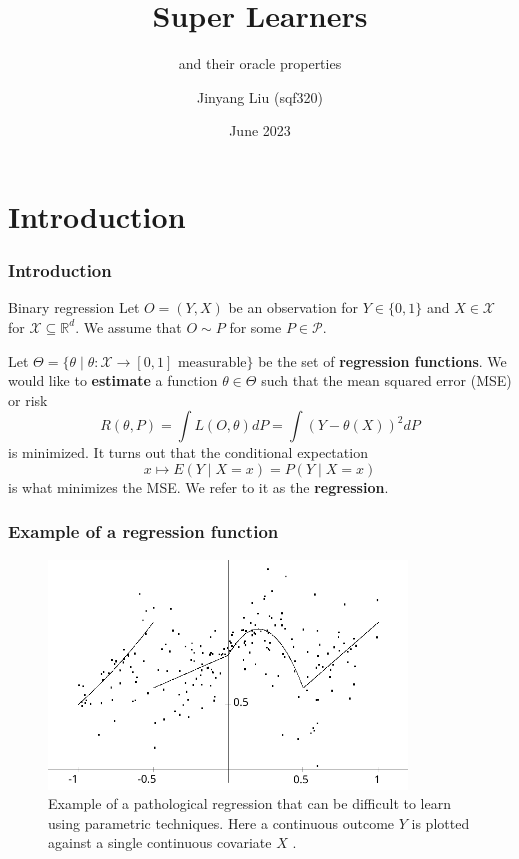 \documentclass{beamer}
\title{Super Learners}
\subtitle{and their oracle properties}
\author[Jinyang Liu (sqf320)]{Jinyang Liu (sqf320)}
\institute[UCPH] %
{
  Department of Mathematical Sciences\\
  University of Copenhagen
}
\date[VLC 2023]{June 2023}
\newcommand{\btheta}{\theta}
\begin{document}
\frame{\titlepage}
\section{Introduction}
\begin{frame}
    \frametitle{Introduction}
    \begin{block}{Binary regression}
        Let $ O = (Y, X) $ be an observation for $ Y \in \{0,1\} $ and $ X \in \mathcal{X}$ for $ \mathcal{X} \subseteq \mathbb{R}^{d} $. We assume that $ O \sim P $ for some $ P \in \mathcal{P} $.
    \end{block}
    Let $ \Theta = \{\btheta \mid \btheta : \mathcal{X} \to [0,1] \text{ measurable}\} $ be the set of \textbf{regression functions}. We would like to \textbf{estimate} a function $ \btheta \in \Theta $ such that the mean squared error (MSE) or risk
        $$
            R(\btheta , P) = \int L(O, \btheta) dP = \int (Y - \theta(X))^2 d P  
        $$
        is minimized. It turns out that the conditional expectation $$ x \mapsto E(Y \mid X = x) = P(Y \mid X = x) $$ is what minimizes the MSE. We refer to it as the \textbf{regression}.  
\end{frame}

\begin{frame}
    \frametitle{Example of a regression function}
    \begin{figure}[H]
        \centering
        \includegraphics[width=0.85\textwidth]{figures/trueregression}
        \caption{Example of a pathological regression that can be difficult to learn using parametric techniques. Here a continuous outcome $ Y $ is plotted against a single continuous covariate $ X $ \citep{gyorfi2002distribution}.}
    \end{figure}
\end{frame}
\end{document}
